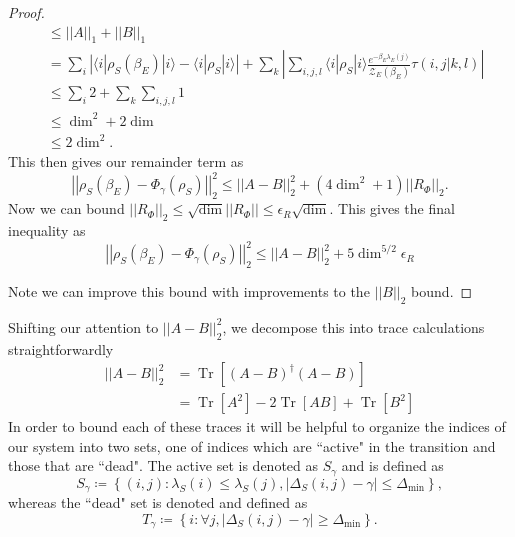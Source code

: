 \documentclass{article}
\newcommand{\ket}[1]{|#1\rangle}
\newcommand{\bra}[1]{\langle #1|}
\newcommand{\brackets}[1]{\left[ #1 \right]}
\newcommand{\abs}[1]{\left| #1 \right|}
\newcommand{\norm}[1]{\left| \left| #1 \right| \right|}
\newcommand{\set}[1]{\left\{ #1 \right\}}
\DeclareMathOperator{\Tr}{Tr}
\newcommand{\trace}[1]{\Tr \brackets{ #1 }}
\newcommand{\partfun}{\mathcal{Z}}
\begin{document}
\begin{proof}
\begin{align}
        &\leq \norm{A}_1 + \norm{B}_1 \\
        &= \sum_{i} \abs{\bra{i}\rho_S(\beta_E) \ket{i} - \bra{i} \rho_S \ket{i}} + \sum_k \abs{\sum_{i,j,l} \bra{i} \rho_S \ket{i} \frac{e^{-\beta_E \lambda_E(j)}}{\partfun_E(\beta_E)} \tau(i,j | k,l)} \\
        &\leq \sum_i 2 + \sum_k \sum_{i,j,l} 1 \\
        &\leq \dim^2 + 2 \dim \\
        &\leq 2 \dim^2.
    \end{align}
    This then gives our remainder term as
    \begin{equation}
        \norm{\rho_S(\beta_E) - \Phi_{\gamma}(\rho_S)}_2^2 \leq \norm{A - B}_2^2 + (4 \dim^2 + 1) \norm{R_{\Phi}}_2.
    \end{equation}
    Now we can bound $\norm{R_{\Phi}}_2 \leq \sqrt{\dim} \norm{R_{\Phi}} \leq \epsilon_{R} \sqrt{\dim}$. This gives the final inequality as
    \begin{equation}
        \norm{\rho_S(\beta_E) - \Phi_{\gamma}(\rho_S)}_2^2 \leq \norm{A - B}_2^2 + 5 \dim^{5/2} \epsilon_{R}
    \end{equation}
    
    Note we can improve this bound with improvements to the $\norm{B}_2$ bound. 
    \end{proof}
    
    
    Shifting our attention to $\norm{A-B}_2^2$, we decompose this into trace calculations straightforwardly
    \begin{align}
        \norm{A-B}_2^2 &= \trace{(A-B)^\dagger (A-B)} \\
        &= \trace{A^2} - 2 \trace{AB} + \trace{B^2}
    \end{align}
    In order to bound each of these traces it will be helpful to organize the indices of our system into two sets, one of indices which are ``active" in the transition and those that are ``dead". The active set is denoted as $S_{\gamma}$ and is defined as
    \begin{equation}
        S_{\gamma} \coloneqq \set{(i,j) : \lambda_S(i) \leq \lambda_S(j), |\Delta_S(i,j) - \gamma| \leq \Delta_{\min}},
    \end{equation}
    whereas the ``dead" set is denoted and defined as
    \begin{equation}
    T_{\gamma} \coloneqq \set{i : \forall j, |\Delta_S(i,j) - \gamma| \geq \Delta_{\min}}. 
    \end{equation}
    
\end{document}

